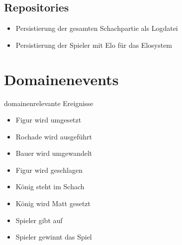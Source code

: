 \subsection*{Repositories}

\begin{itemize}
    \item Persistierung der gesamten Schachpartie als Logdatei
    \item Persistierung der Spieler mit Elo für das Elosystem
\end{itemize}

\section{Domainenevents}

domainenrelevante Ereignisse

\begin{itemize}
    \item Figur wird umgesetzt
    \item Rochade wird ausgeführt
    \item Bauer wird umgewandelt
    \item Figur wird geschlagen
    \item König steht im Schach
    \item König wird Matt gesetzt
    \item Spieler gibt auf
    \item Spieler gewinnt das Spiel
\end{itemize}